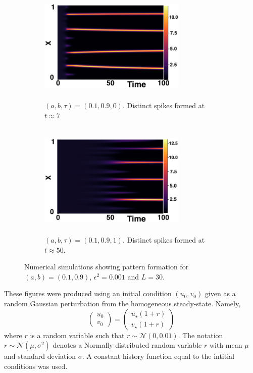 \begin{figure}[H]
    \centering
    \begin{subfigure}[b]{0.45\textwidth}
        \centering
        \includegraphics[width=7cm,height = 5.5cm]{patt1.png}
        \caption{$(a,b,\tau)=(0.1,0.9,0)$. Distinct spikes formed at $t\approx7$ }
        \label{}
    \end{subfigure}
    \hfill
    \begin{subfigure}[b]{0.45\textwidth}
        \centering
        \includegraphics[width=7cm,height = 5.5cm]{patt2.png}
        \caption{$(a,b,\tau)=(0.1,0.9,1)$. Distinct spikes formed at $t\approx50$.}
        \label{}
    \end{subfigure}
    \caption{Numerical simulations showing pattern formation for $(a,b)=(0.1,0.9)$, $\epsilon^2=0.001$ and $L=30$.}
    \label{fig:fixedsim2}
\end{figure}
These figures were produced using an initial condition $(u_0,v_0)$ given as a random Gaussian perturbation from the homogeneous steady-state. Namely, $$\begin{pmatrix}u_0\\v_0\end{pmatrix}=\begin{pmatrix}u_\star(1+r)\\v_\star(1+r)\end{pmatrix}$$ where $r$ is a random variable such that $r\sim\mathcal{N}(0,0.01)$. The notation $r\sim\mathcal{N}(\mu,\sigma^2)$ denotes a Normally distributed random variable $r$ with mean $\mu$ and standard deviation $\sigma$. A constant history function equal to the intitial conditions was used.

